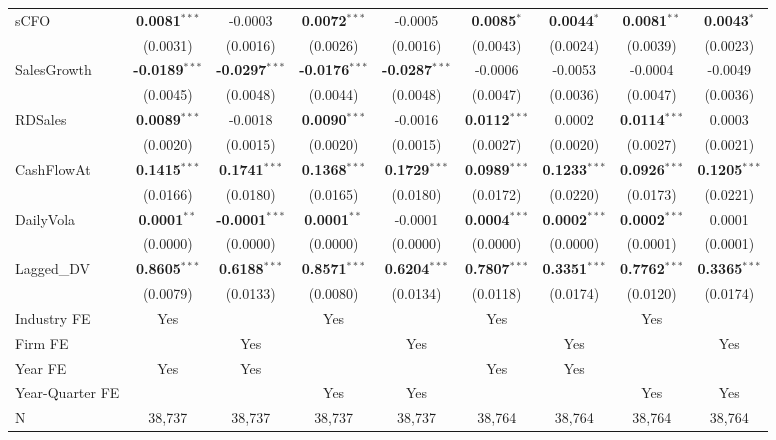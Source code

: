 \documentclass[11pt,a4paper]{article}
\begin{document}
\begin{table}[htbp]
\begin{tabular}{lcccccccc}
sCFO & \textbf{0.0081}$^{***}$ & -0.0003 & \textbf{0.0072}$^{***}$ & -0.0005 & \textbf{0.0085}$^{*}$ & \textbf{0.0044}$^{*}$ & \textbf{0.0081}$^{**}$ & \textbf{0.0043}$^{*}$ \\
 & (0.0031) & (0.0016) & (0.0026) & (0.0016) & (0.0043) & (0.0024) & (0.0039) & (0.0023) \\
SalesGrowth & \textbf{-0.0189}$^{***}$ & \textbf{-0.0297}$^{***}$ & \textbf{-0.0176}$^{***}$ & \textbf{-0.0287}$^{***}$ & -0.0006 & -0.0053 & -0.0004 & -0.0049 \\
 & (0.0045) & (0.0048) & (0.0044) & (0.0048) & (0.0047) & (0.0036) & (0.0047) & (0.0036) \\
RDSales & \textbf{0.0089}$^{***}$ & -0.0018 & \textbf{0.0090}$^{***}$ & -0.0016 & \textbf{0.0112}$^{***}$ & 0.0002 & \textbf{0.0114}$^{***}$ & 0.0003 \\
 & (0.0020) & (0.0015) & (0.0020) & (0.0015) & (0.0027) & (0.0020) & (0.0027) & (0.0021) \\
CashFlowAt & \textbf{0.1415}$^{***}$ & \textbf{0.1741}$^{***}$ & \textbf{0.1368}$^{***}$ & \textbf{0.1729}$^{***}$ & \textbf{0.0989}$^{***}$ & \textbf{0.1233}$^{***}$ & \textbf{0.0926}$^{***}$ & \textbf{0.1205}$^{***}$ \\
 & (0.0166) & (0.0180) & (0.0165) & (0.0180) & (0.0172) & (0.0220) & (0.0173) & (0.0221) \\
DailyVola & \textbf{0.0001}$^{**}$ & \textbf{-0.0001}$^{***}$ & \textbf{0.0001}$^{**}$ & -0.0001 & \textbf{0.0004}$^{***}$ & \textbf{0.0002}$^{***}$ & \textbf{0.0002}$^{***}$ & 0.0001 \\
 & (0.0000) & (0.0000) & (0.0000) & (0.0000) & (0.0000) & (0.0000) & (0.0001) & (0.0001) \\
Lagged\_DV & \textbf{0.8605}$^{***}$ & \textbf{0.6188}$^{***}$ & \textbf{0.8571}$^{***}$ & \textbf{0.6204}$^{***}$ & \textbf{0.7807}$^{***}$ & \textbf{0.3351}$^{***}$ & \textbf{0.7762}$^{***}$ & \textbf{0.3365}$^{***}$ \\
 & (0.0079) & (0.0133) & (0.0080) & (0.0134) & (0.0118) & (0.0174) & (0.0120) & (0.0174) \\
\midrule
Industry FE & Yes &  & Yes &  & Yes &  & Yes &  \\
Firm FE &  & Yes &  & Yes &  & Yes &  & Yes \\
Year FE & Yes & Yes &  &  & Yes & Yes &  &  \\
Year-Quarter FE &  &  & Yes & Yes &  &  & Yes & Yes \\
\midrule
N & 38,737 & 38,737 & 38,737 & 38,737 & 38,764 & 38,764 & 38,764 & 38,764 \\

\end{tabular}
\end{table}
\end{document}
